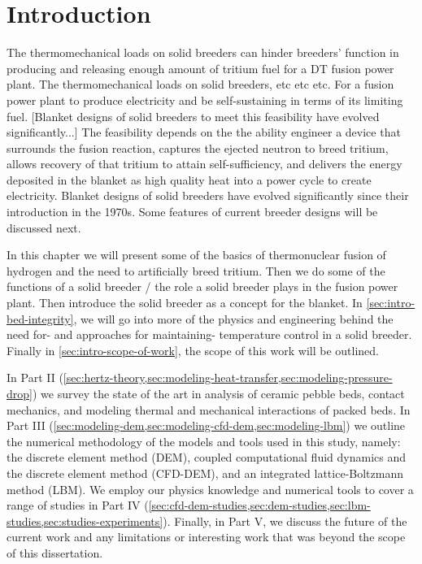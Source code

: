 \chapter{Introduction} \label{sec:introduction}
The thermomechanical loads on solid breeders can hinder breeders' function in producing and releasing enough amount of tritium fuel for a DT fusion power plant. The thermomechanical loads on solid breeders, etc etc etc. For a fusion power plant to produce electricity and be self-sustaining in terms of its limiting fuel. [Blanket designs of solid breeders to meet this feasibility have evolved significantly...] The feasibility depends on the the ability engineer a device that surrounds the fusion reaction, captures the ejected neutron to breed tritium, allows recovery of that tritium to attain self-sufficiency, and delivers the energy deposited in the blanket as high quality heat into a power cycle to create electricity. Blanket designs of solid breeders have evolved significantly since their introduction in the 1970s. Some features of current breeder designs will be discussed next.

In this chapter we will present some of the basics of thermonuclear fusion of hydrogen and the need to artificially breed tritium.  Then we do some of the functions of a solid breeder / the role a solid breeder plays in the fusion power plant. Then introduce the solid breeder as a concept for the blanket. In \cref{sec:intro-bed-integrity}, we will go into more of the physics and engineering behind the need for- and approaches for maintaining- temperature control in a solid breeder. Finally in \cref{sec:intro-scope-of-work}, the scope of this work will be outlined.




%






In Part II (\cref{sec:hertz-theory,sec:modeling-heat-transfer,sec:modeling-pressure-drop}) we survey the state of the art in analysis of ceramic pebble beds, contact mechanics, and modeling thermal and mechanical interactions of packed beds.  In Part III (\cref{sec:modeling-dem,sec:modeling-cfd-dem,sec:modeling-lbm}) we outline the numerical methodology of the models and tools used in this study, namely: the discrete element method (DEM), coupled computational fluid dynamics and the discrete element method (CFD-DEM), and an integrated lattice-Boltzmann method (LBM). We employ our physics knowledge and numerical tools to cover a range of studies in Part IV (\cref{sec:cfd-dem-studies,sec:dem-studies,sec:lbm-studies,sec:studies-experiments}). Finally, in Part V, we discuss the future of the current work and any limitations or interesting work that was beyond the scope of this dissertation.